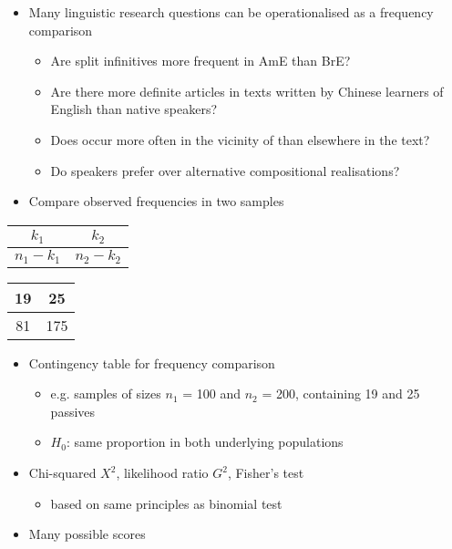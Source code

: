 \documentclass[a4paper,landscape,headrule,footrule,xetex]{foils}
\begin{document}
\begin{itemize}
\item Many linguistic research questions can be
operationalised as a frequency comparison
\begin{itemize}
\item Are split infinitives more frequent in AmE than BrE?
\item Are there more definite articles in texts written by
Chinese learners of English than native speakers?
\item Does  occur more often in the vicinity of 
than elsewhere in the text?
\item Do speakers prefer  over
alternative compositional realisations?
\end{itemize}
\item Compare observed frequencies in two samples
\end{itemize}



\begin{tabular}{|c|c|}
\hline
  $k_1 $ & $k_2 $ \\
\hline
  $n_1 - k_1 $ & $n_2 - k_2 $ \\
\hline
\end{tabular}
\begin{tabular}{|c|c|}
\hline
  19 & 25 \\
\hline
  81 & 175 \\ 
\hline
\end{tabular}

\begin{itemize}
\item Contingency table for frequency comparison
\begin{itemize}
\item e.g. samples of sizes $n_1$ = 100 and $n_2$ = 200,
containing 19 and 25 passives
\item $H_0$: same proportion in both underlying populations
\end{itemize}
\item Chi-squared $X^2$, likelihood ratio $G^2$, Fisher's test
  \begin{itemize}
  \item based on same principles as binomial test
  \end{itemize}
\item Many possible scores
\end{itemize}
\end{document}
